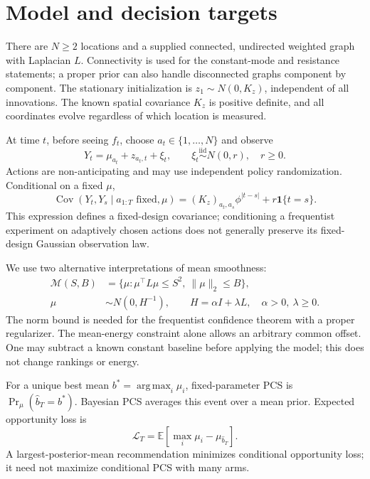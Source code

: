 \documentclass[11pt]{article}
\newcommand{\E}{\mathbb E}
\newcommand{\Cov}{\operatorname{Cov}}
\newcommand{\argmax}{\operatorname*{arg\,max}}
\newcommand{\one}{\mathbf1}
\begin{document}
\section{Model and decision targets}
There are $N\ge2$ locations and a supplied connected, undirected weighted graph with Laplacian $L$. Connectivity is used for the constant-mode and resistance statements; a proper prior can also handle disconnected graphs component by component. The stationary initialization is $z_1\sim N(0,K_z)$, independent of all innovations. The known spatial covariance $K_z$ is positive definite, and all coordinates evolve regardless of which location is measured.

At time $t$, before seeing $f_t$, choose $a_t\in\{1,\ldots,N\}$ and observe
\begin{equation}
Y_t=\mu_{a_t}+z_{a_t,t}+\xi_t,\qquad
\xi_t\stackrel{\mathrm{iid}}\sim N(0,r),\quad r\ge0.
\label{eq:observation}
\end{equation}
Actions are non-anticipating and may use independent policy randomization. Conditional on a fixed $\mu$,
\begin{equation}
\Cov(Y_t,Y_s\mid a_{1:T}\text{ fixed},\mu)
=(K_z)_{a_t,a_s}\phi^{|t-s|}+r\one\{t=s\}.
\end{equation}
This expression defines a fixed-design covariance; conditioning a frequentist experiment on adaptively chosen actions does not generally preserve its fixed-design Gaussian observation law.

We use two alternative interpretations of mean smoothness:
\begin{align}
\mathcal M(S,B)&=\{\mu:\mu^\top L\mu\le S^2,\ \|\mu\|_2\le B\},
\label{eq:mean-class}\\
\mu&\sim N(0,H^{-1}),\qquad H=\alpha I+\lambda L,
\quad \alpha>0,\ \lambda\ge0.
\label{eq:mean-prior}
\end{align}
The norm bound is needed for the frequentist confidence theorem with a proper regularizer. The mean-energy constraint alone allows an arbitrary common offset. One may subtract a known constant baseline before applying the model; this does not change rankings or energy.

For a unique best mean $b^*=\argmax_i\mu_i$, fixed-parameter PCS is $\Pr_\mu(\widehat b_T=b^*)$. Bayesian PCS averages this event over a mean prior. Expected opportunity loss is
\begin{equation}
\mathcal L_T=\E[\max_i\mu_i-\mu_{\widehat b_T}].
\label{eq:eoc}
\end{equation}
A largest-posterior-mean recommendation minimizes conditional opportunity loss; it need not maximize conditional PCS with many arms.
\end{document}
